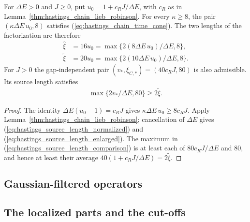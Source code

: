 \begin{lemma}
    \label{thm:hastings_source_lengths}
    \leanok
    For $\Delta E>0$ and $J\ge0$, put $u_0=1+c_RJ/\Delta E$, with $c_R$ as
    in Lemma~\ref{thm:hastings_chain_lieb_robinson}. For every $\kappa\ge8$,
    the pair $(\kappa\Delta E\,u_0,8)$ satisfies
    (\ref{eq:hastings_chain_time_cone}). The two lengths of the
    factorization are therefore
    \begin{align}
        \hat\xi   & =16u_0=\max\{2(8\Delta E\,u_0)/\Delta E,8\},
        \label{eq:hastings_source_length_normalized}              \\
        \tilde\xi & =20u_0=\max\{2(10\Delta E\,u_0)/\Delta E,8\}.
        \label{eq:hastings_source_length_enlarged}
    \end{align}
    For $J>0$ the gap-independent pair $(v_*,\xi_{C,*})=(40c_RJ,80)$ is
    also admissible. Its source length satisfies
    \begin{align}
        \max\{2v_*/\Delta E,80\}\ge2\tilde\xi.
        \label{eq:hastings_source_length_comparison}
    \end{align}
\end{lemma}
\begin{proof}\leanok
    The identity $\Delta E(u_0-1)=c_RJ$ gives
    $\kappa\Delta E\,u_0\ge8c_RJ$. Apply
    Lemma~\ref{thm:hastings_chain_lieb_robinson}; cancellation of
    $\Delta E$ gives (\ref{eq:hastings_source_length_normalized}) and
    (\ref{eq:hastings_source_length_enlarged}). The maximum in
    (\ref{eq:hastings_source_length_comparison}) is at least each of
    $80c_RJ/\Delta E$ and $80$, and hence at least their average
    $40(1+c_RJ/\Delta E)=2\tilde\xi$.
\end{proof}

\subsection*{Gaussian-filtered operators}

\subsection*{The localized parts and the cut-offs}

